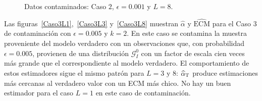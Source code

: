 \begin{figure}[H]
	\caption{\label{Caso2L8}\small Datos contaminados: Caso $2$, $\epsilon=0.001$  y $L=8$.}
\end{figure}

Las figuras~\ref{Caso3L1},~\ref{Caso3L3} y~\ref{Caso3L8} muestran $\widehat{\alpha}$ y $\widehat{\text{ECM}}$ para el Caso 3 de contaminación con $\epsilon=0.005$ y $k=2$. En este caso se contamina la muestra proveniente del modelo verdadero con un observaciones que, con probabilidad $\epsilon=0.005$, provienen de una distribución $\mathcal G_I^0$ con un factor de escala cien veces más grande que el correspondiente al modelo verdadero. El comportamiento de estos estimadores sigue el mismo patrón para $L=3 \text{ y } 8$: $\widehat\alpha_{\text T}$ produce estimaciones más cercanas al verdadero valor con un ECM más chico. No hay un buen estimador para el caso $L=1$ en este caso de contaminación.

